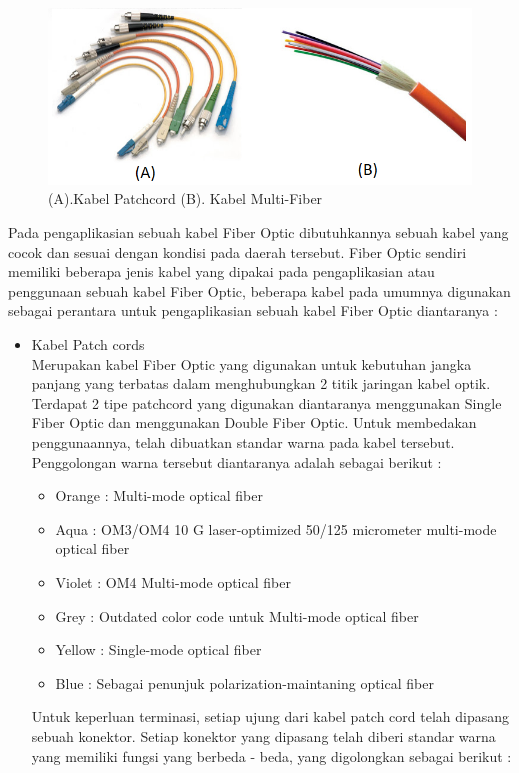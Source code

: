 \begin{flushleft}
\begin{figure}[ht]
\centerline{\includegraphics[width=1\textwidth]{figures/patchandmulti.png}}
\caption{(A).Kabel Patchcord  (B). Kabel Multi-Fiber}
\label{Skema Fiber Optic_02}
\end{figure}
Pada pengaplikasian sebuah kabel Fiber Optic dibutuhkannya sebuah kabel yang cocok dan sesuai dengan kondisi pada daerah tersebut. Fiber Optic sendiri memiliki beberapa jenis kabel yang dipakai pada pengaplikasian atau penggunaan sebuah kabel Fiber Optic, beberapa kabel pada umumnya digunakan sebagai perantara untuk pengaplikasian sebuah kabel Fiber Optic diantaranya : 
\begin{itemize}
\item Kabel Patch cords \\ Merupakan kabel Fiber Optic yang digunakan untuk kebutuhan jangka panjang yang terbatas dalam menghubungkan 2 titik jaringan kabel optik. Terdapat 2 tipe patchcord yang digunakan diantaranya menggunakan Single Fiber Optic dan menggunakan Double Fiber Optic. Untuk membedakan penggunaannya, telah dibuatkan standar warna pada kabel tersebut. Penggolongan warna tersebut diantaranya adalah sebagai berikut : \\
	\begin{itemize}
		\item Orange : Multi-mode optical fiber
		\item Aqua : OM3/OM4 10 G laser-optimized 50/125 micrometer multi-mode optical fiber
		\item Violet : OM4 Multi-mode optical fiber
		\item Grey : Outdated color code untuk Multi-mode optical fiber
		\item Yellow : Single-mode optical fiber
		\item Blue : Sebagai penunjuk polarization-maintaning optical fiber
	\end{itemize}
Untuk keperluan terminasi, setiap ujung dari kabel patch cord telah dipasang sebuah konektor. Setiap konektor yang dipasang telah diberi standar warna yang memiliki fungsi yang berbeda - beda, yang digolongkan sebagai berikut : \\

\end{itemize}
\end{flushleft}
